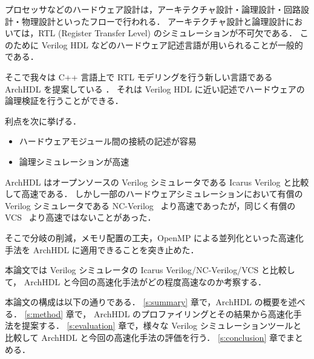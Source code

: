 プロセッサなどのハードウェア設計は，アーキテクチャ設計・論理設計・回路設計・物理設計といったフローで行われる．
アーキテクチャ設計と論理設計においては，RTL (Register Transfer Level) のシミュレーションが不可欠である．
このために Verilog HDL などのハードウェア記述言語が用いられることが一般的である．

そこで我々は C++ 言語上で RTL モデリングを行う新しい言語である ArchHDL を提案している \cite{satos:archhdl}．
それは Verilog HDL に近い記述でハードウェアの論理検証を行うことができる．

利点を次に挙げる．

\begin{itemize}
\itemsep1pt\parskip0pt
\item
  ハードウェアモジュール間の接続の記述が容易
\item
  論理シミュレーションが高速
\end{itemize}

ArchHDL はオープンソースの Verilog シミュレータである Icarus Verilog \cite{iverilog}と比較して高速である．
しかし一部のハードウェアシミュレーションにおいて有償の Verilog シミュレータである NC-Verilog~\cite{ncverilog} より高速であったが，同じく有償の VCS~\cite{vcs} より高速ではないことがあった．

そこで分岐の削減，メモリ配置の工夫，OpenMP による並列化といった高速化手法を ArchHDL に適用できることを突き止めた．

本論文では Verilog シミュレータの Icarus Verilog/NC-Verilog/VCS と比較して，
ArchHDL と今回の高速化手法がどの程度高速なのか考察する．

本論文の構成は以下の通りである． \ref{s:summary} 章で，ArchHDL の概要を述べる．
\ref{s:method} 章で， ArchHDL のプロファイリングとその結果から高速化手法を提案する．
\ref{s:evaluation} 章で，様々な Verilog シミュレーションツールと比較して ArchHDL と今回の高速化手法の評価を行う．
\ref{s:conclusion} 章でまとめる．